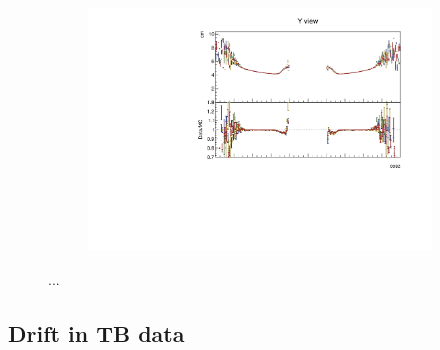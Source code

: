 \documentclass[12pt,a4paper]{article}
\begin{document}
\begin{figure}[h!]
\begin{subfigure}{0.5\textwidth}
  \end{subfigure}
  \begin{subfigure}{0.5\textwidth}
    \includegraphics[width=\linewidth]{PlotsAngularDistribution/cm_cosz_y.pdf}
  \end{subfigure}
  \caption{...}
  \label{figAbsCalibCosZ2}
\end{figure}

\subsection{Drift in TB data}
\end{document}

